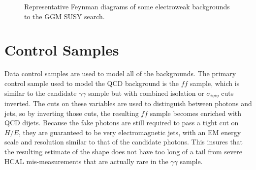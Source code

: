 \documentclass[dissertation.tex]{subfiles}
\begin{document}
\begin{figure}
	\caption{Representative Feynman diagrams of some electroweak backgrounds to the GGM SUSY search.}
	\label{fig:EW_background_diagrams}
\end{figure}



\section{Control Samples}
\label{sec:Control Samples}

Data control samples are used to model all of the backgrounds.  The primary control sample used to model the QCD background is the $\mathit{ff}$ sample, which is similar to the candidate $\gamma\gamma$ sample but with combined isolation or $\sigma_{i\eta i\eta}$ cuts inverted.  The cuts on these variables are used to distinguish between photons and jets, so by inverting those cuts, the resulting $\mathit{ff}$ sample becomes enriched with QCD dijets.  Because the fake photons are still required to pass a tight cut on $H/E$, they are guaranteed to be very electromagnetic jets, with an EM energy scale and resolution similar to that of the candidate photons.  This insures that the resulting estimate of the \MET shape does not have too long of a tail from severe HCAL mis-measurements that are actually rare in the $\gamma\gamma$ sample.

\end{document}
